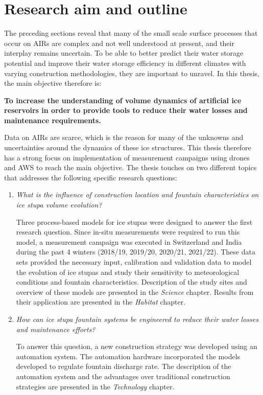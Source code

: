 \section{Research aim and outline}

The preceding sections reveal that many of the small scale surface processes that occur on \ac{AIRs} are complex
and not well understood at present, and their interplay remains uncertain. To be able to better predict their
water storage potential and improve their water storage efficiency in different climates with varying
construction methodologies, they are important to unravel. In this thesis, the main objective therefore is:

\begin{thesis_quotation}

  \textbf{To increase the understanding of volume dynamics of artificial ice reservoirs in order to
  provide tools to reduce their water losses and maintenance requirements.}

\end{thesis_quotation}

Data on \ac{AIRs} are scarce, which is the reason for many of the unknowns and uncertainties around the dynamics
of these ice structures. This thesis therefore has a strong focus on implementation of measurement campaigns
using drones and \ac{AWS} to reach the main objective. The thesis touches on two different topics that
addresses the following specific research questions:

\begin{enumerate}

  \item \textit{What is the influence of construction location and fountain characteristics on ice stupa volume
    evolution?}

Three process-based models for ice stupas were designed to answer the first research question. Since in-situ
    measurements were required to run this model, a measurement campaign was executed in Switzerland and India
    during the past 4 winters (2018/19, 2019/20, 2020/21, 2021/22). These data sets provided the necessary
    input, calibration and validation data to model the evolution of ice stupas and study their sensitivity to
    meteorological conditions and fountain characteristics. Description of the study sites and overview of these
    models are presented in the \textit{Science} chapter. Results from their application are presented in the
    \textit{Habitat} chapter.

  \item \textit{How can ice stupa fountain systems be engineered to reduce their water losses and maintenance
    efforts?}

To answer this question, a new construction strategy was developed using an automation system. The automation
    hardware incorporated the models developed to regulate fountain discharge rate. The description of the
    automation system and the advantages over traditional construction strategies are presented in the
    \textit{Technology} chapter.

\end{enumerate}

